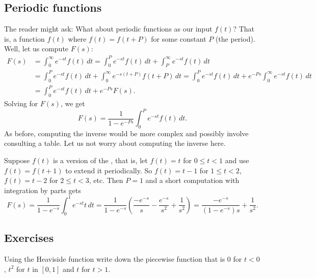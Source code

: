 \subsection{Periodic functions}

The reader might ask: What about periodic functions as our input $f(t)$?
That is, a function $f(t)$ where $f(t) = f(t+P)$ for some constant $P$ (the period).
Well, let us compute $F(s)$:
\begin{equation*}
\begin{split}
F(s) & = \int_0^\infty e^{-st} f(t) \, dt
= \int_0^P e^{-st} f(t) \, dt
+ \int_P^\infty e^{-st} f(t) \, dt
\\
& = \int_0^P e^{-st} f(t) \, dt
+ \int_0^\infty e^{-s(t+P)} f(t+P) \, dt
= \int_0^P e^{-st} f(t) \, dt
+ e^{-Ps} \int_0^\infty e^{-st} f(t) \, dt
\\
& = \int_0^P e^{-st} f(t) \, dt
+ e^{-Ps} F(s) .
\end{split}
\end{equation*}
Solving for $F(s)$, we get
\begin{equation*}
F(s)
=
\frac{1}{1-e^{-Ps}}
\int_0^P e^{-st} f(t) \, dt .
\end{equation*}
As before, computing the inverse would be more complex and possibly
involve consulting a table.  Let us not worry about computing the inverse
here.

\begin{example}
Suppose $f(t)$ is a version of the \emph{}, that is,
let
$f(t) = t$ for $0 \leq t < 1$
and use $f(t)=f(t+1)$ to extend it periodically.  So
$f(t) = t-1$ for $1 \leq t < 2$, 
$f(t) = t-2$ for $2 \leq t < 3$, etc.  Then $P=1$ and
a short computation with integration by parts gets
\begin{equation*}
F(s) =
\frac{1}{1-e^{-s}}
\int_0^1 e^{-st} t \, dt 
=
\frac{1}{1-e^{-s}}
\left(
\frac{-e^{-s}}{s}-\frac{e^{-s}}{s^2} + \frac{1}{s^2}
\right)
=
\frac{-e^{-s}}{(1-e^{-s})s} + \frac{1}{s^2} .
\end{equation*}
\end{example}

\subsection{Exercises}

\begin{exercise}
Using the Heaviside function write down the piecewise function
that is 0 for $t < 0$, $t^2$ for $t$ in $[0,1]$ and $t$ for $t > 1$.
\end{exercise}


